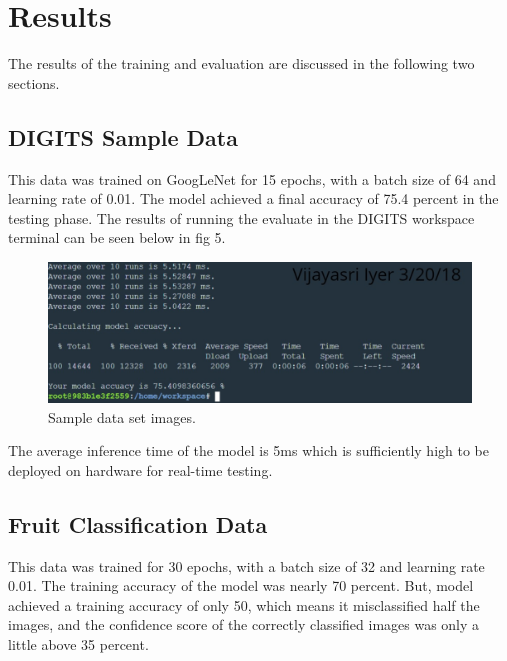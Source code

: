 \documentclass[10pt,journal,compsoc]{IEEEtran}
\begin{document}
\section{Results}
The results of the training and evaluation are discussed in the following two sections.

\subsection{DIGITS Sample Data}
This data was trained on GoogLeNet for 15 epochs, with a batch size of 64 and learning rate of 0.01. The model achieved a final accuracy of 75.4 percent in the testing phase. The results of running the evaluate in the DIGITS workspace terminal can be seen below in fig 5.

\begin{figure}[tbhp]
      \centering
      \includegraphics[width=\linewidth]{res.png}
      \caption{Sample data set images.}
      \label{fig:robot1}
\end{figure}

The average inference time of the model is 5ms which is sufficiently high to be deployed on hardware for real-time testing.


\subsection{Fruit Classification Data}
This data was trained for 30 epochs, with a batch size of 32 and learning rate 0.01. The training accuracy of the model was nearly 70 percent. But, model achieved a training accuracy of only 50, which means it misclassified half the images, and the confidence score of the correctly classified images was only a little above 35 percent.
\end{document}
